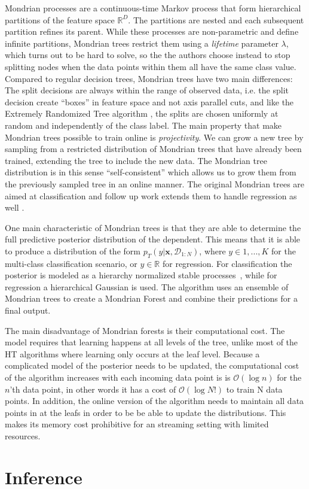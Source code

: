 Mondrian processes are a continuous-time
Markov process that form hierarchical partitions of the feature space $\mathbb{R}^D$.
The partitions are nested and each subsequent partition refines its parent. While
these processes are non-parametric and define infinite partitions, Mondrian trees
restrict them using a \emph{lifetime} parameter $\lambda$, which turns out to be hard to solve,
so the the authors choose instead to stop splitting nodes when the data points
within them all have the same class value. Compared to regular decision trees,
Mondrian trees have two main differences: The split decisions are always within
the range of observed data, i.e. the split decision create ``boxes'' in feature
space and not axis parallel cuts, and like the Extremely Randomized Tree algorithm
\cite{ert}, the splits are chosen uniformly at random and independently of the
class label. The main property that make Mondrian trees possible to train
online is \emph{projectivity}. We can grow a new tree by sampling from a restricted
distribution of Mondrian trees that have already been trained, extending the tree
to include the new data. The Mondrian tree distribution is in this sense ``self-consistent''
\cite{mondrian-forests-original} which allows us to grow them from the previously
sampled tree in an online manner. The original Mondrian trees are aimed at classification
and follow up work extends them to handle regression as well \cite{mondrian-forests-regression}.

One main characteristic of Mondrian trees is that they are able to determine the full
predictive posterior distribution of the dependent. This means that it is able to
produce a distribution of the form $p_T(y |\mathbf{x}, \mathcal{D}_{1:N})$, where
$y \in {1,..., K}$ for the multi-class classification scenario, or $y \in \mathbb{R}$
for regression. For classification the posterior is modeled as a hierarchy
normalized stable processes~\cite{nsp}, while for regression a hierarchical Gaussian is used.
The algorithm uses an ensemble of Mondrian trees to create a Mondrian Forest and combine
their predictions for a final output.

The main disadvantage of Mondrian forests is their computational cost. The model
requires that learning happens at all levels of the tree, unlike most of the HT
algorithms where learning only occurs at the leaf level. Because a complicated
model of the posterior needs to be updated, the computational cost of the algorithm
increases with each incoming data point is is $\mathcal{O}(\log n)$ for the $n$'th
data point, in other words it has a cost of $\mathcal{O}(\log N!)$ to train N
data points. In addition, the online version of the algorithm needs to maintain
all data points in at the leafs in order to be be able to update the distributions.
This makes its memory cost prohibitive  for an streaming setting with limited resources.



\section{Inference}
\label{sec:bg-dt-inference}
